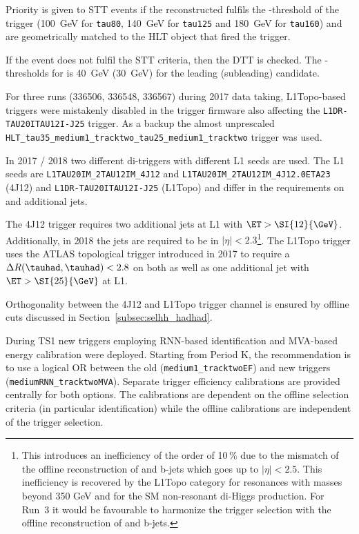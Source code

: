 Priority is given to STT events if the reconstructed \tauhad fulfils the
\pT-threshold of the trigger (\SI{100}{\GeV} for \verb|tau80|, \SI{140}{\GeV}
for \verb|tau125| and \SI{180}{\GeV} for \verb|tau160|) and are geometrically
matched to the HLT object that fired the trigger.

If the event does not fulfil the STT criteria, then the DTT is checked. The
\pT-thresholds for \tauhad is \SI{40}{\GeV} (\SI{30}{\GeV}) for the leading
(subleading) \tauhad candidate.

For three runs (336506, 336548, 336567) during 2017 data taking, L1Topo-based
triggers were mistakenly disabled in the trigger firmware also affecting the
\verb|L1DR-TAU20ITAU12I-J25| trigger. As a backup the almost unprescaled
\verb|HLT_tau35_medium1_tracktwo_tau25_medium1_tracktwo| trigger was used.

In 2017 / 2018 two different di-\tauhad triggers with different L1 seeds are
used. The L1 seeds are \verb|L1TAU20IM_2TAU12IM_4J12| and
\verb|L1TAU20IM_2TAU12IM_4J12.0ETA23| (4J12) and \verb|L1DR-TAU20ITAU12I-J25|
(L1Topo) and differ in the requirements on \tauhad and additional jets.

The 4J12 trigger requires two additional jets at L1 with
$\ET > \SI{12}{\GeV}$.  Additionally, in 2018 the jets are required to
be in $|\eta| < 2.3$\footnote{This introduces an inefficiency of the
  order of 10\,\% due to the mismatch of the offline reconstruction of
  \tauhad and b-jets which goes up to $|\eta| < 2.5$. This
  inefficiency is recovered by the L1Topo category for resonances with
  masses beyond 350 GeV and for the SM non-resonant di-Higgs
  production. For Run~3 it would be favourable to harmonize the
  trigger selection with the offline reconstruction of \tauhad and
  b-jets.}. The L1Topo trigger uses the ATLAS topological trigger
introduced in 2017 to require a $\Delta R(\tauhad, \tauhad) < 2.8$ on
both \tauhad as well as one additional jet with $\ET > \SI{25}{\GeV}$
at L1.

Orthogonality between the 4J12 and L1Topo trigger channel is ensured by offline
cuts discussed in Section~\ref{subsec:selhh_hadhad}.

During TS1 new \tauhad triggers employing RNN-based \tauhad
identification and MVA-based energy calibration were
deployed. Starting from Period K, the recommendation is to use a
logical OR between the old (\verb|medium1_tracktwoEF|) and new
triggers (\verb|mediumRNN_tracktwoMVA|). Separate trigger efficiency
calibrations are provided centrally for both options. The calibrations
are dependent on the offline \tauhad selection criteria (in particular
\tauhad identification) while the offline \tauhad calibrations are
independent of the trigger selection.

